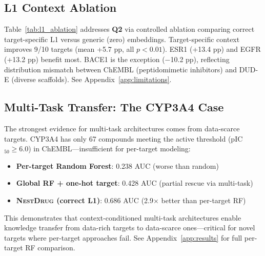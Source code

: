 \documentclass[sigconf]{acmart}
\newcommand{\methodname}{\textsc{NestDrug}}
\begin{document}
\subsection{L1 Context Ablation}

Table~\ref{tab:l1_ablation} addresses \textbf{Q2} via controlled ablation comparing correct target-specific L1 versus generic (zero) embeddings. Target-specific context improves 9/10 targets (mean +5.7 pp, all $p < 0.01$). ESR1 (+13.4 pp) and EGFR (+13.2 pp) benefit most. BACE1 is the exception ($-$10.2 pp), reflecting distribution mismatch between ChEMBL (peptidomimetic inhibitors) and DUD-E (diverse scaffolds). See Appendix~\ref{app:limitations}.

\subsection{Multi-Task Transfer: The CYP3A4 Case}

The strongest evidence for multi-task architectures comes from data-scarce targets. CYP3A4 has only 67 compounds meeting the active threshold (pIC$_{50} \geq 6.0$) in ChEMBL---insufficient for per-target modeling:
\begin{itemize}[noitemsep,topsep=0pt]
    \item \textbf{Per-target Random Forest}: 0.238 AUC (worse than random)
    \item \textbf{Global RF + one-hot target}: 0.428 AUC (partial rescue via multi-task)
    \item \textbf{\methodname{} (correct L1)}: 0.686 AUC (2.9$\times$ better than per-target RF)
\end{itemize}
This demonstrates that context-conditioned multi-task architectures enable knowledge transfer from data-rich targets to data-scarce ones---critical for novel targets where per-target approaches fail. See Appendix~\ref{app:results} for full per-target RF comparison.
\end{document}
